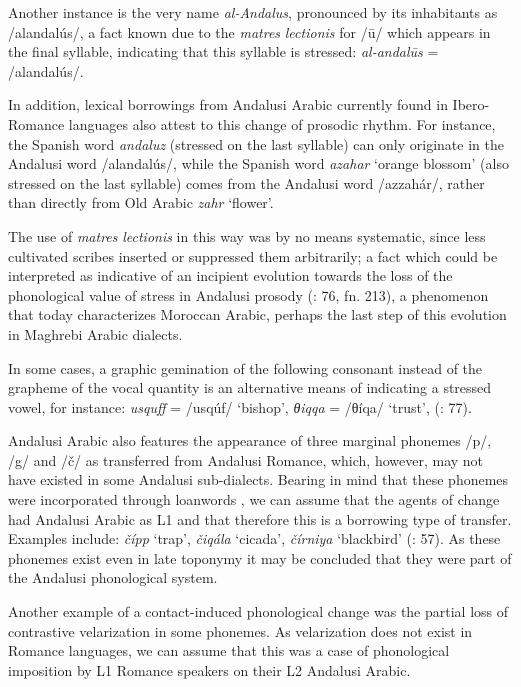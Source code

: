 \documentclass[output=paper,modfonts,nonflat]{langsci/langscibook}
\begin{document}
Another instance is the very name \textit{al-Andalus}, pronounced by its inhabitants as /alandalús/, a fact known due to the \textit{matres} \textit{lectionis} for /ū/ which appears in the final syllable, indicating that this syllable is stressed: {} \textit{al-andalūs} = /alandalús/.

In addition, lexical borrowings from Andalusi Arabic currently found in Ibero-Romance languages also attest to this change of prosodic rhythm. For instance, the Spanish word \textit{andaluz} (stressed on the last syllable) can only originate in the Andalusi word /alandalús/, while the Spanish word \textit{azahar} ‘orange blossom’ (also stressed on the last syllable) comes from the Andalusi word /azzahár/, rather than directly from Old Arabic \textit{zahr} ‘flower’.

The use of \textit{matres} \textit{lectionis} in this way was by no means systematic, since {less cultivated scribes inserted or suppressed them arbitrarily}; a fact which could be interpreted as indicative of an incipient evolution towards the loss of the phonological value of stress in Andalusi prosody (\citealt{CorrientePereiraVicente2015}: 76, fn. 213), a phenomenon that today characterizes Moroccan Arabic, perhaps the last step of this evolution in Maghrebi Arabic dialects.

{In some cases, a graphic gemination of the following consonant instead of the grapheme of the vocal quantity is an alternative means of indicating a stressed vowel, for instance: {} \textit{usquff} = /usqúf/ ‘bishop’, {} \textit{θiqqa} = /θíqa/ ‘trust’,} {(\citealt{CorrientePereiraVicente2015}: 77)}{.} 

Andalusi Arabic also features the appearance of three marginal phonemes /p/, /g/ and /č/ as transferred from Andalusi Romance, which, however, may not have existed in some Andalusi sub-dialects. Bearing in mind that these phonemes were incorporated through loanwords \citep{Corriente1978}, we can assume that the agents of change had Andalusi Arabic as L1 and that therefore this is a borrowing type of transfer. Examples include: \textit{čípp} ‘trap’, \textit{čiqála} ‘cicada’, \textit{čírniya} ‘blackbird’ (\citealt{CorrientePereiraVicente2015}: 57). As these phonemes exist even in late toponymy it may be concluded that they were part of the Andalusi phonological system. 

Another example of a contact-induced phonological change was the partial loss of contrastive velarization in some phonemes. As velarization does not exist in Romance languages, we can assume that this was a case of phonological imposition by L1 Romance speakers on their L2 Andalusi Arabic. 
\end{document}
